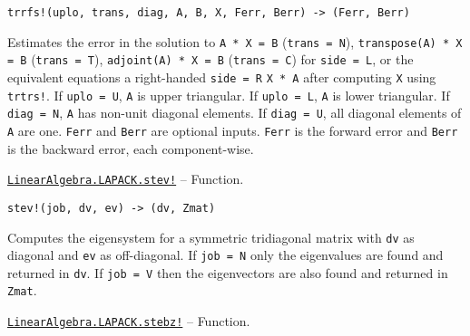 \begin{adjustwidth}{2em}{0pt}


\begin{verbatim}
trrfs!(uplo, trans, diag, A, B, X, Ferr, Berr) -> (Ferr, Berr)
\end{verbatim}

Estimates the error in the solution to \texttt{A * X = B} (\texttt{trans = N}), \texttt{transpose(A) * X = B} (\texttt{trans = T}), \texttt{adjoint(A) * X = B} (\texttt{trans = C}) for \texttt{side = L}, or the equivalent equations a right-handed \texttt{side = R} \texttt{X * A} after computing \texttt{X} using \texttt{trtrs!}. If \texttt{uplo = U}, \texttt{A} is upper triangular. If \texttt{uplo = L}, \texttt{A} is lower triangular. If \texttt{diag = N}, \texttt{A} has non-unit diagonal elements. If \texttt{diag = U}, all diagonal elements of \texttt{A} are one. \texttt{Ferr} and \texttt{Berr} are optional inputs. \texttt{Ferr} is the forward error and \texttt{Berr} is the backward error, each component-wise.



\end{adjustwidth}
\hypertarget{14670728896781161925}{}
\hyperlink{14670728896781161925}{\texttt{LinearAlgebra.LAPACK.stev!}}  -- {Function.}

\begin{adjustwidth}{2em}{0pt}


\begin{verbatim}
stev!(job, dv, ev) -> (dv, Zmat)
\end{verbatim}

Computes the eigensystem for a symmetric tridiagonal matrix with \texttt{dv} as diagonal and \texttt{ev} as off-diagonal. If \texttt{job = N} only the eigenvalues are found and returned in \texttt{dv}. If \texttt{job = V} then the eigenvectors are also found and returned in \texttt{Zmat}.



\end{adjustwidth}
\hypertarget{10865649637100518709}{}
\hyperlink{10865649637100518709}{\texttt{LinearAlgebra.LAPACK.stebz!}}  -- {Function.}

